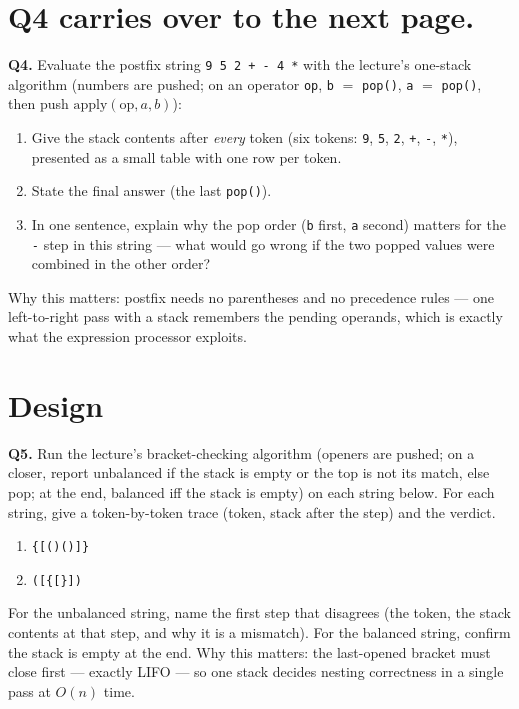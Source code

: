 \documentclass[11pt]{article}
\begin{document}
\section*{Q4 carries over to the next page.}

\textbf{Q4.} Evaluate the postfix string \texttt{9 5 2 + - 4 *} with the lecture's one-stack algorithm (numbers are pushed; on an operator \texttt{op}, \texttt{b} $=$ \texttt{pop()}, \texttt{a} $=$ \texttt{pop()}, then push $\text{apply}(\text{op}, a, b)$):
\begin{enumerate}
  \item[(a)] Give the stack contents after \emph{every} token (six tokens: \texttt{9}, \texttt{5}, \texttt{2}, \texttt{+}, \texttt{-}, \texttt{*}), presented as a small table with one row per token.
  \item[(b)] State the final answer (the last \texttt{pop()}).
  \item[(c)] In one sentence, explain why the pop order (\texttt{b} first, \texttt{a} second) matters for the \texttt{-} step in this string --- what would go wrong if the two popped values were combined in the other order?
\end{enumerate}
Why this matters: postfix needs no parentheses and no precedence rules --- one left-to-right pass with a stack remembers the pending operands, which is exactly what the expression processor exploits.

\section{Design}

\textbf{Q5.} Run the lecture's bracket-checking algorithm (openers are pushed; on a closer, report unbalanced if the stack is empty or the top is not its match, else pop; at the end, balanced iff the stack is empty) on each string below. For each string, give a token-by-token trace (token, stack after the step) and the verdict.
\begin{enumerate}
  \item[(a)] \texttt{\{[()()]\}}
  \item[(b)] \texttt{([\{[\}])}
\end{enumerate}
For the unbalanced string, name the first step that disagrees (the token, the stack contents at that step, and why it is a mismatch). For the balanced string, confirm the stack is empty at the end.
Why this matters: the last-opened bracket must close first --- exactly LIFO --- so one stack decides nesting correctness in a single pass at $O(n)$ time.
\end{document}
